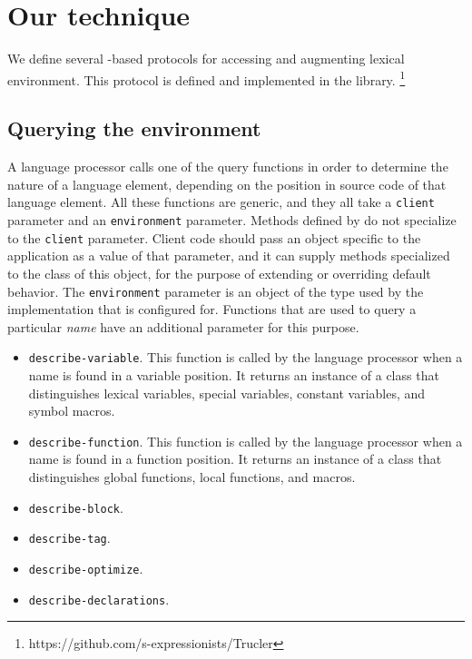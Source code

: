 \section{Our technique}

We define several \clos{}-based protocols for accessing and augmenting
lexical environment.  This protocol is defined and implemented in the
\trucler{} library.%
\footnote{https://github.com/s-expressionists/Trucler}

\subsection{Querying the environment}

A language processor calls one of the query functions in order to
determine the nature of a language element, depending on the position
in source code of that language element.  All these functions are
generic, and they all take a \texttt{client} parameter and an
\texttt{environment} parameter.  Methods defined by \trucler{} do not
specialize to the \texttt{client} parameter.  Client code should pass
an object specific to the application as a value of that parameter,
and it can supply methods specialized to the class of this object, for
the purpose of extending or overriding default behavior.  The
\texttt{environment} parameter is an object of the type used by the
implementation that \trucler{} is configured for.  Functions that are
used to query a particular \emph{name} have an additional parameter
for this purpose.

\begin{itemize}
\item \texttt{describe-variable}.  This function is called by the
  language processor when a name is found in a variable position.  It
  returns an instance of a class that distinguishes lexical variables,
  special variables, constant variables, and symbol macros.
\item \texttt{describe-function}.  This function is called by the
  language processor when a name is found in a function position.  It
  returns an instance of a class that distinguishes global functions,
  local functions, and macros.
\item \texttt{describe-block}.
\item \texttt{describe-tag}.
\item \texttt{describe-optimize}.
\item \texttt{describe-declarations}.
\end{itemize}
